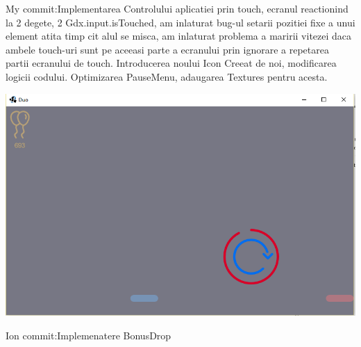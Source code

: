 \newline \newline
My commit:Implementarea Controlului aplicatiei prin touch, ecranul reactionind la 2 degete, 2 Gdx.input.isTouched, am inlaturat bug-ul setarii pozitiei fixe a unui element atita timp cit alul se misca, am inlaturat problema a maririi vitezei daca ambele touch-uri sunt pe aceeasi parte a ecranului prin ignorare a repetarea partii ecranului de touch. Introducerea noului Icon Creeat de noi, modificarea logicii codului. Optimizarea PauseMenu, adaugarea Textures pentru acesta.
\begin{center}
\includegraphics[width=0.7\linewidth]{screenshot007}
\end{center}

\newline \newline
Ion commit:Implemenatere BonusDrop

